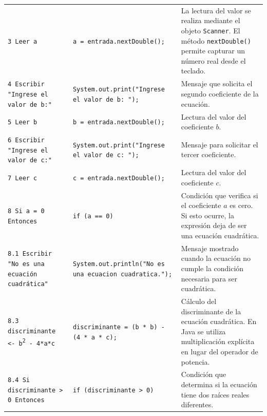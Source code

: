 \documentclass[12pt,twoside]{book}
\begin{document}
\begin{landscape}
\begin{longtable}{p{6cm} p{6cm} p{7.5cm}}
							
							\texttt{3 Leer a}
							&
							\texttt{a = entrada.nextDouble();}
							&
							La lectura del valor se realiza mediante el objeto \texttt{Scanner}. El método \texttt{nextDouble()} permite capturar un número real desde el teclado. \\
							
							
							\texttt{4 Escribir "Ingrese el valor de b:"}
							&
							\texttt{System.out.print("Ingrese el valor de b: ");}
							&
							Mensaje que solicita el segundo coeficiente de la ecuación. \\
							
							
							\texttt{5 Leer b}
							&
							\texttt{b = entrada.nextDouble();}
							&
							Lectura del valor del coeficiente \(b\). \\
							
							
							\texttt{6 Escribir "Ingrese el valor de c:"}
							&
							\texttt{System.out.print("Ingrese el valor de c: ");}
							&
							Mensaje para solicitar el tercer coeficiente. \\
							
							
							\texttt{7 Leer c}
							&
							\texttt{c = entrada.nextDouble();}
							&
							Lectura del valor del coeficiente \(c\). \\
							
							
							\texttt{8 Si a = 0 Entonces}
							&
							\texttt{if (a == 0)}
							&
							Condición que verifica si el coeficiente \(a\) es cero. Si esto ocurre, la expresión deja de ser una ecuación cuadrática. \\
							
							
							\texttt{8.1 Escribir "No es una ecuación cuadrática"}
							&
							\texttt{System.out.println("No es una ecuacion cuadratica.");}
							&
							Mensaje mostrado cuando la ecuación no cumple la condición necesaria para ser cuadrática. \\
							
							
							\texttt{8.3 discriminante <- b\textsuperscript{2} - 4*a*c}
							&
							\texttt{discriminante = (b * b) - (4 * a * c);}
							&
							Cálculo del discriminante de la ecuación cuadrática. En Java se utiliza multiplicación explícita en lugar del operador de potencia. \\
							
							
							\texttt{8.4 Si discriminante > 0 Entonces}
							&
							\texttt{if (discriminante > 0)}
							&
							Condición que determina si la ecuación tiene dos raíces reales diferentes. \\
							

\end{longtable}
\end{landscape}
\end{document}
